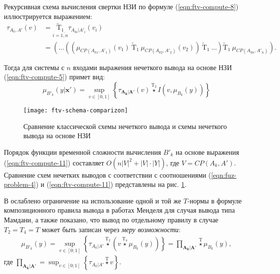 Рекурсивная схема вычисления свертки НЗИ по формуле (\ref{eqn:ftv-compute-8}) иллюстрируется выражением:
\begin{align}
	\label{eqn:ftv-compute-10}
	\tau_{A_k, A'}(v) & = \underset{i=\overline{1,n}}{\mathrm{\tilde{T}_1}}\tau_{A_{ki}|A'_i}(v_i) \\
	& = \left(\dots\left(\left(\mu_{CP(A_{k1}, A'_1)}(v_1)\ \mathrm{\tilde{T}_1}\ \mu_{CP(A_{k2}, A'_2)}(v_2)\right)\ \mathrm{\tilde{T}_1}\ \dots \right) \mathrm{\tilde{T}_1}\ \mu_{CP(A_{kn}, A'_n)}\right).
\end{align}

Тогда для системы с $n$ входами выражения нечеткого вывода на основе НЗИ (\ref{eqn:ftv-compute-5}) примет вид:
\begin{equation}
	\label{eqn:ftv-compute-11}
	\mu_{B'_k}(y|\mathbf{x'}) = \sup_{v \in [0, 1]} \left\{\tau_{\mathbf{A_k}|\mathbf{A'}}(v) \overset{\mathrm{T_2}}{\star} I(v, \mu_{B_k}(y))\right\}
\end{equation}

\begin{figure}[tbh!]
\centering
\texttt{[image: ftv-schema-comparizon]}
\caption{Сравнение классической схемы нечеткого вывода и схемы нечеткого вывода на основе НЗИ}
\label{fig:ftv-schema-comparizon}
\end{figure}

Порядок функции временной сложности вычисления $B'_k$ на основе выражения (\ref{eqn:ftv-compute-11}) составляет $O\left(n|V|^2+|V|\cdot |Y|\right)$, где $V=CP(A_k, A')$. Сравнение схем нечетких выводов с соответствии с соотношениями (\ref{eqn:fuz-problem-4}) и (\ref{eqn:ftv-compute-11}) представлены на рис. \cref{fig:ftv-schema-comparizon}.


В \cite{Sinuk2023} ослаблено ограничение на использование одной и той же $T$-нормы в формуле композиционного правила вывода в работах Менделя для случая вывода типа Мамдани, а также показано, что вывод по отдельному правилу в случае $T_2 = T_4 = T$ может быть записан через \textit{меру возможности}:
\begin{align*}
	\mu_{B'_k}(y) = \sup_{v\in[0;1]}\left\{\tau_{A_{k}|A'} \overset{\mathrm{T_2}}{\star} (v \overset{\mathrm{T_4}}{\star} \mu_{B_k}(y)) \right\} = \textstyle\prod_{\mathbf{A_k}|\mathbf{A'}} \overset{\mathrm{T}}{\star} \mu_{B_k}(y),
\end{align*}
где $\prod_{\mathbf{A_k}|\mathbf{A'}}=\sup_{v\in[0;1]}\left\{\tau_{A_{k}|A'} \overset{\mathrm{T}}{\star} v\right\}$.


